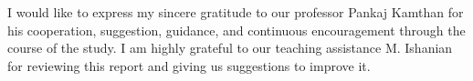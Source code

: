 I would like to express my sincere gratitude to our professor Pankaj Kamthan for his cooperation, suggestion, guidance, and continuous encouragement through the course of the study. I am highly grateful to our teaching assistance M. Ishanian for reviewing this report and giving us suggestions to improve it.\\